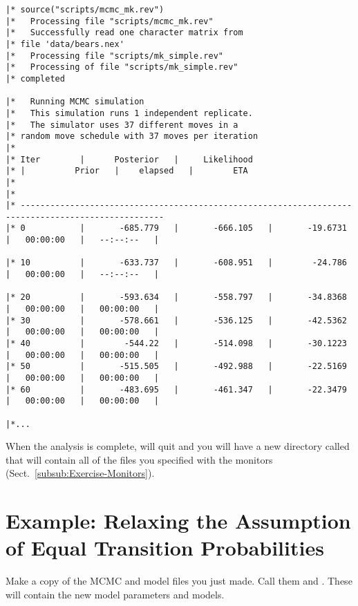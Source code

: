 {\tiny{\tt \begin{snugshade*}
\begin{lstlisting}
|* source("scripts/mcmc_mk.rev")
|*   Processing file "scripts/mcmc_mk.rev"
|*   Successfully read one character matrix from
|* file 'data/bears.nex'
|*   Processing file "scripts/mk_simple.rev"
|*   Processing of file "scripts/mk_simple.rev"
|* completed

|*   Running MCMC simulation
|*   This simulation runs 1 independent replicate.
|*   The simulator uses 37 different moves in a
|* random move schedule with 37 moves per iteration
|*
|* Iter        |      Posterior   |     Likelihood  
|* |          Prior   |    elapsed   |        ETA   
|*
|*
|* ---------------------------------------------------------------------------------------------------
|* 0           |       -685.779   |       -666.105   |       -19.6731   |   00:00:00   |   --:--:--   |

|* 10          |       -633.737   |       -608.951   |        -24.786   |   00:00:00   |   --:--:--   |

|* 20          |       -593.634   |       -558.797   |       -34.8368   |   00:00:00   |   00:00:00   |
|* 30          |       -578.661   |       -536.125   |       -42.5362   |   00:00:00   |   00:00:00   |
|* 40          |        -544.22   |       -514.098   |       -30.1223   |   00:00:00   |   00:00:00   |
|* 50          |       -515.505   |       -492.988   |       -22.5169   |   00:00:00   |   00:00:00   |
|* 60          |       -483.695   |       -461.347   |       -22.3479   |   00:00:00   |   00:00:00   |

|*...
\end{lstlisting}
\end{snugshade*}}}

When the analysis is complete, \RevBayes will quit and you will have a new directory called  that will contain all of the files you specified with the monitors (Sect.\ \ref{subsub:Exercise-Monitors}).


\section{Example: Relaxing the Assumption of Equal Transition Probabilities }

{\begin{framed}
Make a copy of the MCMC and model files you just made. 
Call them  and . 
These will contain the new model parameters and models. \par 
\end{framed}}

